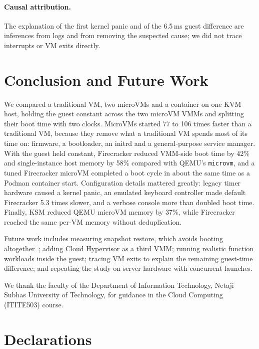 \documentclass[pdflatex,sn-mathphys-num]{sn-jnl}%
\begin{document}
\paragraph{Causal attribution.} The explanation of the first kernel panic and of the 6.5\,ms guest difference are inferences from logs and from removing the suspected cause; we did not trace interrupts or VM exits directly.

\section{Conclusion and Future Work}\label{sec:conclusion}

We compared a traditional VM, two microVMs and a container on one KVM host, holding the guest constant across the two microVM VMMs and splitting their boot time with two clocks. MicroVMs started 77 to 106 times faster than a traditional VM, because they remove what a traditional VM spends most of its time on: firmware, a bootloader, an initrd and a general-purpose service manager. With the guest held constant, Firecracker reduced VMM-side boot time by 42\% and single-instance host memory by 58\% compared with QEMU's \texttt{microvm}, and a tuned Firecracker microVM completed a boot cycle in about the same time as a Podman container start. Configuration details mattered greatly: legacy timer hardware caused a kernel panic, an emulated keyboard controller made default Firecracker 5.3 times slower, and a verbose console more than doubled boot time. Finally, KSM reduced QEMU microVM memory by 37\%, while Firecracker reached the same per-VM memory without deduplication.

Future work includes measuring snapshot restore, which avoids booting altogether~\cite{ustiugov2021reap,ao2022faasnap,lazarev2024sabre}; adding Cloud Hypervisor as a third VMM; running realistic function workloads inside the guest; tracing VM exits to explain the remaining guest-time difference; and repeating the study on server hardware with concurrent launches.

\backmatter


We thank the faculty of the Department of Information Technology, Netaji Subhas University of Technology, for guidance in the Cloud Computing (ITITE503) course.

\section*{Declarations}
\end{document}
